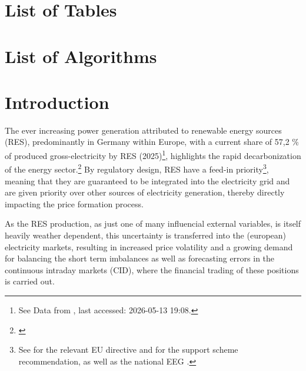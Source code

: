\documentclass[12pt,a4paper]{cau_thesis}
\begin{document}
\chapter*{List of Tables}
\markboth{~}{}
\listoftables
\chapter*{List of Algorithms}
\markboth{~}{} %
\listofalgorithmshere
\chapter{Introduction}\label{ch:introduction}

The ever increasing power generation attributed to renewable energy sources (RES),
predominantly in Germany within Europe, with a current share of 57,2 \% of produced
gross-electricity by RES (2025)\footnote{See Data from \cite{ageb_bruttostromerzeugung_2026}, last accessed: 2026-05-13 19:08.},
highlights the rapid decarbonization of the energy sector.\footnote{\cite[See ][, p.2]{eurelectric2026shortterm}}
By regulatory design, RES have a feed-in priority\footnote{See \cite{eu_red_2018} for the relevant EU directive and \cite{ec_recommendation_supportschemes_2024} for the support scheme recommendation, as well as the national EEG \cite{eeg_2023_feed_in}.}, meaning that they are guaranteed to be
integrated into the electricity grid and are given priority over other sources of electricity
generation, thereby directly impacting the price formation process.

As the RES production, as just one of many influencial external
variables, is itself heavily weather dependent, this uncertainty is
transferred into the (european) electricity markets, resulting in
increased price volatility and a growing demand for balancing the
short term imbalances as well as forecasting errors in the continuous
intraday markets (CID), where the financial trading of these
positions is carried out.
\end{document}
